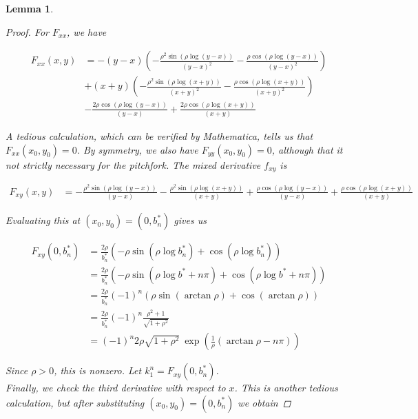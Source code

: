 \documentclass[12pt]{article}
\newtheorem{lemma}{Lemma}
\begin{document}
\begin{lemma}
\begin{proof}
For $F_{xx}$, we have

\begin{align*}
F_{xx}(x, y) &= 
-(y-x) \left(-\frac{\rho^2 \sin \left(\rho \log (y-x)\right)}{(y-x)^2}-\frac{\rho
   \cos \left(\rho \log (y-x) \right)}{(y-x)^2}\right)\\
   &+(x+y) \left(-\frac{\rho^2
   \sin \left(\rho \log (x+y)\right)}{(x+y)^2}-\frac{\rho \cos \left( \rho
   \log (x+y)\right)}{(x+y)^2}\right)\\
   &-\frac{2 \rho \cos \left(\rho \log
   (y-x) \right)}{(y-x)}+\frac{2 \rho \cos \left( \rho \log (x+y) \right)}{
   (x+y)}
\end{align*}

A tedious calculation, which can be verified by Mathematica,  tells us that $F_{xx}(x_0, y_0) = 0$. By symmetry, we also have $F_{yy}(x_0, y_0) = 0$, although that it not strictly necessary for the pitchfork. The mixed derivative $f_{xy}$ is

\begin{align*}
F_{xy}(x, y) &= -\frac{\rho^2 \sin \left(\rho \log (y-x)\right)}{(y-x)}-\frac{\rho^2 \sin
   \left(\rho \log (x+y)\right)}{(x+y)}+\frac{\rho \cos \left(\rho \log (y-x)\right)}{(y-x)}+\frac{\rho \cos \left( \rho \log (x+y) \right)}{(x+y)}
\end{align*}

Evaluating this at $(x_0, y_0) = \left(0, b^*_n \right)$ gives us

\begin{align*}
F_{xy}(0, b^*_n) &= \frac{2 \rho}{b_n^*}\left( -\rho \sin \left(\rho \log b_n^*\right) + \cos \left(\rho \log b_n^*\right) \right)\\
&= \frac{2 \rho}{b_n^*}\left( -\rho \sin \left(\rho \log b^* + n \pi \right) + \cos \left(\rho \log b^* + n \pi \right) \right) \\
&= \frac{2 \rho}{b_n^*} (-1)^n \left( \rho \sin \left(\arctan \rho \right) + \cos \left(\arctan \rho \right) \right)\\ 
&= \frac{2 \rho}{b_n^*} (-1)^n \frac{\rho^2 + 1}{\sqrt{1 + \rho^2}} \\
&= (-1)^n 2 \rho \sqrt{1 + \rho^2} \: \exp{\left(\frac{1}{\rho} (\arctan \rho - n \pi) \right)}
\end{align*}

Since $\rho > 0$, this is nonzero. Let $k_1^n = F_{xy}(0, b^*_n)$. \\

Finally, we check the third derivative with respect to $x$. This is another tedious calculation, but after substituting $(x_0, y_0) = \left(0, b^*_n \right)$ we obtain


\end{proof}
\end{lemma}
\end{document}

